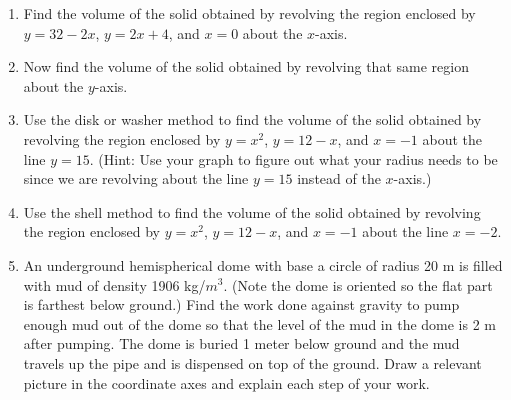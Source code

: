 \documentclass[12pt]{article}
\begin{document}
\begin{enumerate}
	
\item Find the volume of the solid obtained by revolving the region enclosed by $y = 32- 2x$, $y = 2x + 4$, and $x = 0$ about the $x$-axis.

\vspace{3in}

\item Now find the volume of the solid obtained by revolving that same region about the $y$-axis. 

\vspace{4in}

\item Use the disk or washer method to find the volume of the solid obtained by revolving the region enclosed by $y = x^2$, $y = 12 - x$, and $x = -1$ about the line $y = 15$. (Hint: Use your graph to figure out what your radius needs to be since we are revolving about the line $y = 15$ instead of the $x$-axis.)

\vspace{4in}

\item Use the shell method to find the volume of the solid obtained by revolving the region enclosed by $y = x^2$, $y = 12 - x$, and $x = -1$ about the line $x = -2$.

\newpage
\item An underground hemispherical dome with base a circle of radius 20 m is filled with mud of density 1906 kg/$m^3$. (Note the dome  is oriented so the flat part is farthest below ground.) Find the work done against gravity to pump enough mud out of the dome so that the level of the mud in the dome is 2 m after pumping. The dome is buried 1 meter below ground and the mud travels up the pipe and is dispensed on top of the ground. Draw a relevant picture in the coordinate axes and explain each step of your work.


\end{enumerate}
\end{document}
